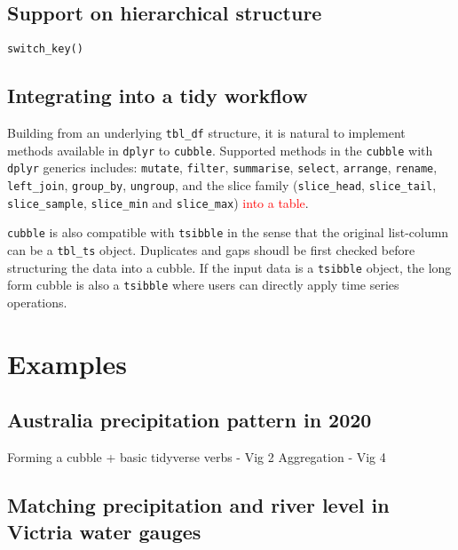 \documentclass[
]{jss}
\begin{document}
\hypertarget{support-on-hierarchical-structure}{%
\subsection{Support on hierarchical
structure}\label{support-on-hierarchical-structure}}

\texttt{switch\_key()}

\hypertarget{integrating-into-a-tidy-workflow}{%
\subsection{Integrating into a tidy
workflow}\label{integrating-into-a-tidy-workflow}}

Building from an underlying \texttt{tbl\_df} structure, it is natural to
implement methods available in \texttt{dplyr} to \texttt{cubble}.
Supported methods in the \texttt{cubble} with \texttt{dplyr} generics
includes: \texttt{mutate}, \texttt{filter}, \texttt{summarise},
\texttt{select}, \texttt{arrange}, \texttt{rename}, \texttt{left\_join},
\texttt{group\_by}, \texttt{ungroup}, and the slice family
(\texttt{slice\_head}, \texttt{slice\_tail}, \texttt{slice\_sample},
\texttt{slice\_min} and \texttt{slice\_max})
\textcolor{red}{into a table}.

\texttt{cubble} is also compatible with \texttt{tsibble} in the sense
that the original list-column can be a \texttt{tbl\_ts} object.
Duplicates and gaps shoudl be first checked before structuring the data
into a cubble. If the input data is a \texttt{tsibble} object, the long
form cubble is also a \texttt{tsibble} where users can directly apply
time series operations.

\newpage

\hypertarget{examples}{%
\section{Examples}\label{examples}}

\hypertarget{australia-precipitation-pattern-in-2020}{%
\subsection{Australia precipitation pattern in
2020}\label{australia-precipitation-pattern-in-2020}}

Forming a cubble + basic tidyverse verbs - Vig 2 Aggregation - Vig 4

\hypertarget{matching-precipitation-and-river-level-in-victria-water-gauges}{%
\subsection{Matching precipitation and river level in Victria water
gauges}\label{matching-precipitation-and-river-level-in-victria-water-gauges}}
\end{document}

